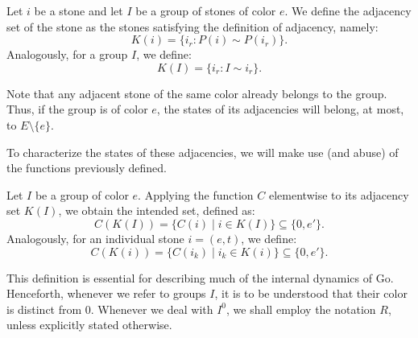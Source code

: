 \begin{definition}
	Let \(i\) be a stone and let \(I\) be a group of stones of color \(e\). We define the adjacency set of the stone as the stones satisfying the definition of adjacency, namely:
	$$K(i) = \{i_r : P(i) \sim P(i_r)\}.$$
	Analogously, for a group $I$, we define:
	$$K(I) = \{i_r : I \sim i_r\}.$$
\end{definition}


Note that any adjacent stone of the same color already belongs to the group. Thus, if the group is of color $e$, the states of its adjacencies will belong, at most, to $E \setminus \{e\}$.

To characterize the states of these adjacencies, we will make use (and abuse) of the functions previously defined.

\begin{definition}\label{def_estados}
	Let $I$ be a group of color $e$. Applying the function $C$ elementwise to its adjacency set $K(I)$, we obtain the intended set, defined as:
	$$C(K(I)) = \{C(i) \mid i \in K(I)\} \subseteq \{0, e'\}.$$
	Analogously, for an individual stone $i = (e,t)$, we define:
	$$C(K(i)) = \{C(i_k) \mid i_k \in K(i)\} \subseteq \{0, e'\}.$$
	\end{definition}

This definition is essential for describing much of the internal dynamics of Go. Henceforth, whenever we refer to groups $I$, it is to be understood that their color is distinct from $0$. Whenever we deal with $I^{0}$, we shall employ the notation $R$, unless explicitly stated otherwise.

